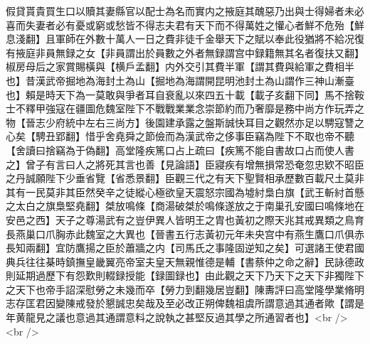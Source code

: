 假貸貰貴買生口以贖其妻縣官以配士為名而實内之掖庭其醜惡乃出與士得婦者未必喜而失妻者必有憂或窮或愁皆不得志夫君有天下而不得萬姓之懽心者鮮不危殆【鮮息淺翻】且軍師在外數十萬人一日之費非徒千金舉天下之賦以奉此役猶將不給况復有掖庭非員無録之女【非員謂出於員數之外者無録謂宫中録籍無其名者復扶又翻】椒房母后之家賞賜橫與【横戶孟翻】内外交引其費半軍【謂其費與給軍之費相半也】昔漢武帝掘地為海封土為山【掘地為海謂開昆明池封土為山謂作三神山漸臺也】賴是時天下為一莫敢與爭者耳自衰亂以來四五十載【載子亥翻下同】馬不捨鞍士不釋甲強寇在疆圖危魏室陛下不戰戰業業念崇節約而乃奢靡是務中尚方作玩弄之物【晉志少府統中左右三尚方】後園建承露之盤斯誠快耳目之觀然亦足以騁寇讐之心矣【騁丑郢翻】惜乎舍堯舜之節儉而為漢武帝之侈事臣竊為陛下不取也帝不聽【舍讀曰捨竊為于偽翻】高堂隆疾篤口占上疏曰【疾篤不能自書故口占而使人書之】曾子有言曰人之將死其言也善【見論語】臣寢疾有增無損常恐奄忽忠欵不昭臣之丹誠願陛下少垂省覽【省悉景翻】臣觀三代之有天下聖賢相承歷數百載尺土莫非其有一民莫非其臣然癸辛之徒縱心極欲皇天震怒宗國為墟紂梟白旗【武王斬紂首懸之太白之旗梟堅堯翻】桀放鳴條【商湯破桀於鳴條遂放之于南巢孔安國曰鳴條地在安邑之西】天子之尊湯武有之豈伊異人皆明王之胄也黃初之際天兆其戒異類之鳥育長燕巢口爪胸赤此魏室之大異也【晉書五行志黃初元年未央宫中有燕生鷹口爪俱赤長知兩翻】宜防鷹揚之臣於蕭牆之内【司馬氏之事隆固逆知之矣】可選諸王使君國典兵往往棊時鎮撫皇畿翼亮帝室夫皇天無親惟德是輔【書蔡仲之命之辭】民詠德政則延期過歷下有怨歎則輟録授能【録圖録也】由此觀之天下乃天下之天下非獨陛下之天下也帝手詔深慰勞之未幾而卒【勞力到翻幾居豈翻】陳夀評曰高堂隆學業脩明志存匡君因變陳戒發於懇誠忠矣哉及至必改正朔俾魏祖虞所謂意過其通者歟【謂是年黄龍見之議也意過其通謂意料之說執之甚堅反過其學之所通習者也】<br />
<br />
